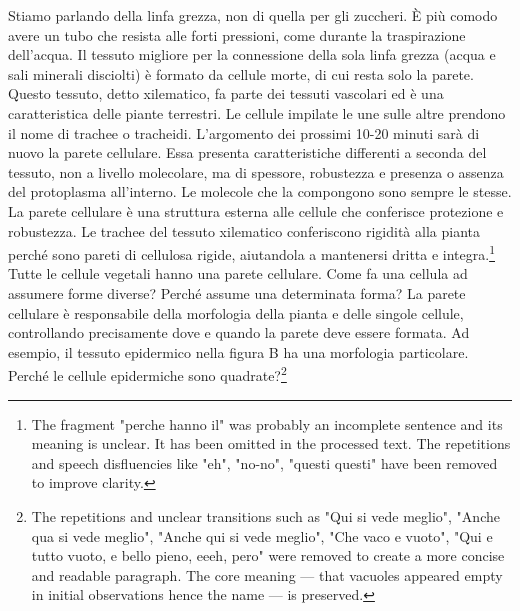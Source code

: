 \documentclass[11pt, a4paper]{article}
\begin{document}
\begin{spacing}{1.15}
Stiamo parlando della linfa grezza, non di quella per gli zuccheri. È più comodo avere un tubo che resista alle forti pressioni, come durante la traspirazione dell'acqua. Il tessuto migliore per la connessione della sola linfa grezza (acqua e sali minerali disciolti) è formato da cellule morte, di cui resta solo la parete. Questo tessuto, detto xilematico, fa parte dei tessuti vascolari ed è una caratteristica delle piante terrestri. Le cellule impilate le une sulle altre prendono il nome di trachee o tracheidi. L'argomento dei prossimi 10-20 minuti sarà di nuovo la parete cellulare. Essa presenta caratteristiche differenti a seconda del tessuto, non a livello molecolare, ma di spessore, robustezza e presenza o assenza del protoplasma all'interno. Le molecole che la compongono sono sempre le stesse. La parete cellulare è una struttura esterna alle cellule che conferisce protezione e robustezza. Le trachee del tessuto xilematico conferiscono rigidità alla pianta perché sono pareti di cellulosa rigide, aiutandola a mantenersi dritta e integra.\footnote{The fragment "perche hanno il" was probably an incomplete sentence and its meaning is unclear. It has been omitted in the processed text. The repetitions and speech disfluencies like "eh", "no-no", "questi questi" have been removed to improve clarity.}
Tutte le cellule vegetali hanno una parete cellulare. Come fa una cellula ad assumere forme diverse? Perché assume una determinata forma? La parete cellulare è responsabile della morfologia della pianta e delle singole cellule, controllando precisamente dove e quando la parete deve essere formata.  Ad esempio, il tessuto epidermico nella figura B ha una morfologia particolare. Perché le cellule epidermiche sono quadrate?\footnote{The repetitions and unclear transitions such as "Qui si vede meglio", "Anche qua si vede meglio", "Anche qui si vede meglio", "Che vaco e vuoto",  "Qui e tutto vuoto, e bello pieno, eeeh, pero" were removed to create a more concise and readable paragraph.  The core meaning — that vacuoles appeared empty in initial observations hence the name — is preserved.}

\end{spacing}
\end{document}
